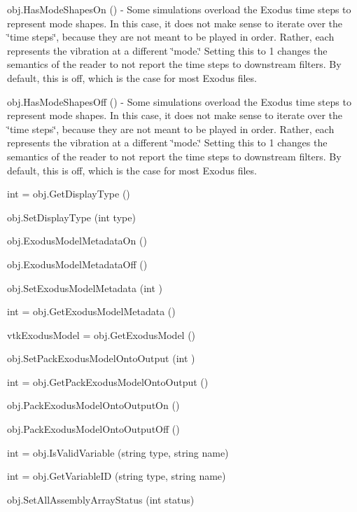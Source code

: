 \begin{DoxyItemize}
\item {\ttfamily obj.\-Has\-Mode\-Shapes\-On ()} -\/ Some simulations overload the Exodus time steps to represent mode shapes. In this case, it does not make sense to iterate over the \char`\"{}time steps\char`\"{}, because they are not meant to be played in order. Rather, each represents the vibration at a different \char`\"{}mode.\char`\"{} Setting this to 1 changes the semantics of the reader to not report the time steps to downstream filters. By default, this is off, which is the case for most Exodus files.  
\item {\ttfamily obj.\-Has\-Mode\-Shapes\-Off ()} -\/ Some simulations overload the Exodus time steps to represent mode shapes. In this case, it does not make sense to iterate over the \char`\"{}time steps\char`\"{}, because they are not meant to be played in order. Rather, each represents the vibration at a different \char`\"{}mode.\char`\"{} Setting this to 1 changes the semantics of the reader to not report the time steps to downstream filters. By default, this is off, which is the case for most Exodus files.  
\item {\ttfamily int = obj.\-Get\-Display\-Type ()}  
\item {\ttfamily obj.\-Set\-Display\-Type (int type)}  
\item {\ttfamily obj.\-Exodus\-Model\-Metadata\-On ()}  
\item {\ttfamily obj.\-Exodus\-Model\-Metadata\-Off ()}  
\item {\ttfamily obj.\-Set\-Exodus\-Model\-Metadata (int )}  
\item {\ttfamily int = obj.\-Get\-Exodus\-Model\-Metadata ()}  
\item {\ttfamily vtk\-Exodus\-Model = obj.\-Get\-Exodus\-Model ()}  
\item {\ttfamily obj.\-Set\-Pack\-Exodus\-Model\-Onto\-Output (int )}  
\item {\ttfamily int = obj.\-Get\-Pack\-Exodus\-Model\-Onto\-Output ()}  
\item {\ttfamily obj.\-Pack\-Exodus\-Model\-Onto\-Output\-On ()}  
\item {\ttfamily obj.\-Pack\-Exodus\-Model\-Onto\-Output\-Off ()}  
\item {\ttfamily int = obj.\-Is\-Valid\-Variable (string type, string name)}  
\item {\ttfamily int = obj.\-Get\-Variable\-I\-D (string type, string name)}  
\item {\ttfamily obj.\-Set\-All\-Assembly\-Array\-Status (int status)}  

\end{DoxyItemize}
